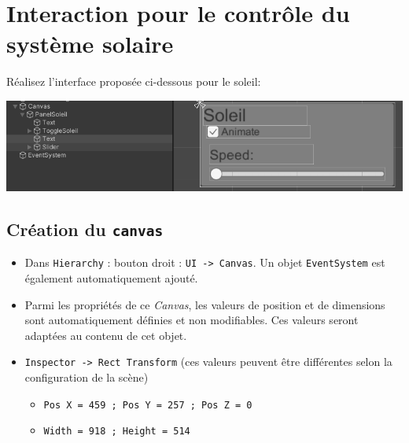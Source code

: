 \documentclass[a4paper,10pt]{article}
\newenvironment{solution}%
{\begin{tcolorbox}[breakable,colback=red!5!white,colframe=red!75!black,title=Solution]}%
{\end{tcolorbox}}
\begin{document}
\section{Interaction pour le contrôle du système solaire}

Réalisez l'interface proposée ci-dessous pour le soleil:
\begin{center}
	\includegraphics[width=0.7\linewidth]{rc/ui_control_sun_planet}
\end{center}

\ifversionenseignant
\begin{solution}
\subsection{Création du \texttt{canvas}}
\begin{itemize}
	\item Dans \texttt{Hierarchy} : bouton droit : \texttt{UI -> Canvas}. Un objet \texttt{EventSystem} est également automatiquement ajouté.
	\item Parmi les propriétés de ce \textit{Canvas}, les valeurs de position et de dimensions sont automatiquement définies et non modifiables. Ces valeurs seront adaptées au contenu de cet objet.
	\item \texttt{Inspector -> Rect Transform}	(ces valeurs peuvent être différentes selon la configuration de la scène)
	\begin{itemize}
		\item 	\texttt{Pos X = 459 ; Pos Y = 257 ; Pos Z = 0}
		\item \texttt{Width = 918 ; Height = 514   }		
	\end{itemize}	
\end{itemize}


\end{solution}
\end{document}
